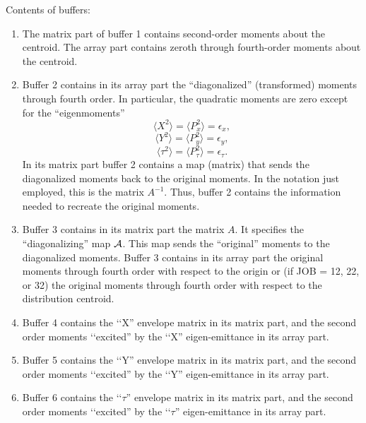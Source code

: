 \noindent Contents of buffers:
\begin{enumerate}
\item The matrix part of buffer 1 contains second-order moments about the centroid.  The array part contains zeroth through fourth-order moments about the centroid.

\item Buffer 2 contains in its array part the ``diagonalized'' (transformed) moments through fourth order.  In particular, the quadratic moments are zero except for the ``eigenmoments''
\begin{equation}
\langle X^2\rangle = \langle P^2_x\rangle = \epsilon_x,
\end{equation}
\begin{equation}
\langle Y^2\rangle = \langle P^2_y\rangle = \epsilon_y,
\end{equation}
\begin{equation}
\langle \tau^2\rangle = \langle P^2_{\tau}\rangle = \epsilon_{\tau}.
\end{equation}
In its matrix part buffer 2 contains a map (matrix)
that sends the diagonalized moments back to the original moments.  In the notation just employed, this is the matrix $A^{-1}$.  Thus, buffer 2
contains the information needed to recreate the original moments.

\item Buffer 3 contains in its matrix part the matrix $A$.  It specifies the ``diagonalizing''
map ${\cal A}$.  This map sends the ``original'' moments to the diagonalized
moments.  Buffer 3 contains in its array part the original moments through fourth order
with respect to the origin or (if JOB = 12, 22, or 32) the original
moments through fourth order with respect to the distribution centroid.

\item Buffer 4 contains the \lq\lq X'' envelope matrix in its
matrix part, and the second order moments \lq\lq excited'' by the \lq\lq X''
eigen-emittance in its array part.

\item Buffer 5 contains the \lq\lq Y'' envelope matrix in its
matrix part, and the second order moments \lq\lq excited'' by the \lq\lq Y''
eigen-emittance in its array part.

\item Buffer 6 contains the \lq\lq $\tau$'' envelope matrix in its
matrix part, and the second order moments \lq\lq excited'' by the \lq\lq $\tau$''
eigen-emittance in its array part.
\end{enumerate}

